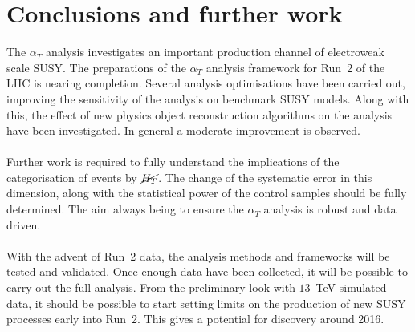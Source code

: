 \section{Conclusions and further work}
\label{sec:conclusion}

The $\alpha_T$ analysis investigates an important production channel of electroweak scale SUSY. The preparations of the $\alpha_T$ analysis framework for Run~2 of the LHC is nearing completion. Several analysis optimisations have been carried out, improving the sensitivity of the analysis on benchmark SUSY models. Along with this, the effect of new physics object reconstruction algorithms on the analysis have been investigated. In general a moderate improvement is observed.
\\\\
Further work is required to fully understand the implications of the categorisation of events by $\cancel{H_T}$. The change of the systematic error in this dimension, along with the statistical power of the control samples should be fully determined. The aim always being to ensure the $\alpha_T$ analysis is robust and data driven.
\\\\
With the advent of Run~2 data, the analysis methods and frameworks will be tested and validated. Once enough data have been collected, it will be possible to carry out the full analysis. From the preliminary look with $13$~TeV simulated data, it should be possible to start setting limits on the production of new SUSY processes early into Run~2. This gives a potential for discovery around 2016. 